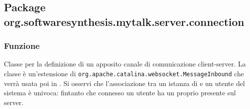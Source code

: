 \subsection{Package org.softwaresynthesis.mytalk.server.connection}\label{sec:connection}


\subsubsection*{Funzione}
Classe per la definizione di un apposito canale di comunicazione client-server. La classe è un'estensione di \texttt{org.apache.catalina.websocket.MessageInbound} che verrà usata poi in . Si osservi che l'associazione tra un istanza di  e un utente del sistema è univoca: fintanto che connesso un utente ha un proprio  presente sul server.

